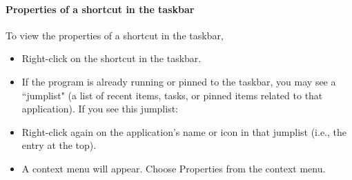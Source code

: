 \documentclass{article}
\begin{document}
\paragraph{Properties of a shortcut in the taskbar}
To view the properties of a shortcut in the taskbar, 
\begin{itemize}
\item Right-click on the shortcut in the taskbar.
\item If the program is already running or pinned to the taskbar, you may see a ``jumplist" (a list of recent items, tasks, or pinned items related to that application). If you see this jumplist:
\item Right-click again on the application's name or icon in that jumplist (i.e., the entry at the top).
\item A context menu will appear. Choose Properties from the context menu.
\end{itemize}
\end{document}
